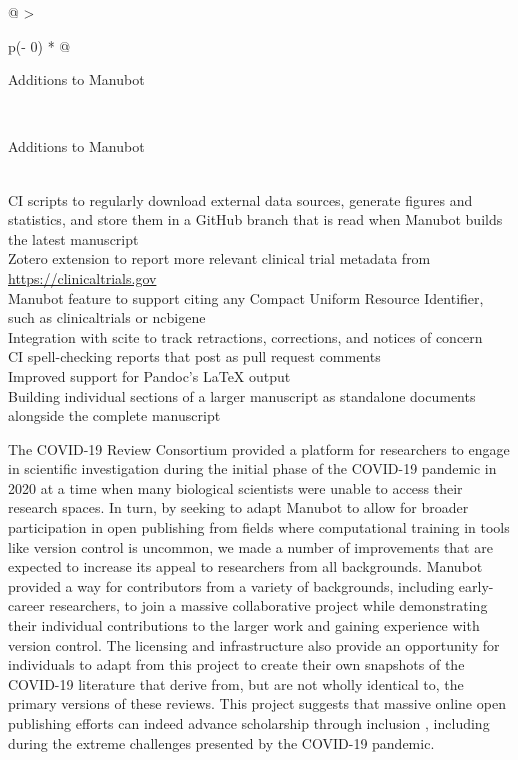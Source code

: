 \documentclass[twocolumn]{ceurart}
\begin{document}
\begin{longtable}[]{@{}
  >{\raggedright\arraybackslash}p{(\columnwidth - 0\tabcolsep) * }@{}}
\caption{List of extensions added to Manubot's functionalities for the COVID-19 collaborative review.
\label{tbl:manubot-addons}}\tabularnewline
\toprule
\begin{minipage}[b]{\linewidth}\raggedright
Additions to Manubot
\end{minipage} \\
\midrule
\endfirsthead
\toprule
\begin{minipage}[b]{\linewidth}\raggedright
Additions to Manubot
\end{minipage} \\
\midrule
\endhead
CI scripts to regularly download external data sources, generate figures and statistics, and store them in a GitHub branch that is read when Manubot builds the latest manuscript \\
Zotero extension to report more relevant clinical trial metadata from \url{https://clinicaltrials.gov} \\
Manubot feature to support citing any Compact Uniform Resource Identifier, such as clinicaltrials or ncbigene \\
Integration with scite to track retractions, corrections, and notices of concern \\
CI spell-checking reports that post as pull request comments \\
Improved support for Pandoc's LaTeX output \\
Building individual sections of a larger manuscript as standalone documents alongside the complete manuscript \\
\bottomrule
\end{longtable}

The COVID-19 Review Consortium provided a platform for researchers to engage in scientific investigation during the initial phase of the COVID-19 pandemic in 2020 at a time when many biological scientists were unable to access their research spaces.
In turn, by seeking to adapt Manubot to allow for broader participation in open publishing from fields where computational training in tools like version control is uncommon, we made a number of improvements that are expected to increase its appeal to researchers from all backgrounds.
Manubot provided a way for contributors from a variety of backgrounds, including early-career researchers, to join a massive collaborative project while demonstrating their individual contributions to the larger work and gaining experience with version control.
The licensing and infrastructure also provide an opportunity for individuals to adapt from this project to create their own snapshots of the COVID-19 literature that derive from, but are not wholly identical to, the primary versions of these reviews.
This project suggests that massive online open publishing efforts can indeed advance scholarship through inclusion \citep{PoDz2q0A}, including during the extreme challenges presented by the COVID-19 pandemic.
\end{document}

